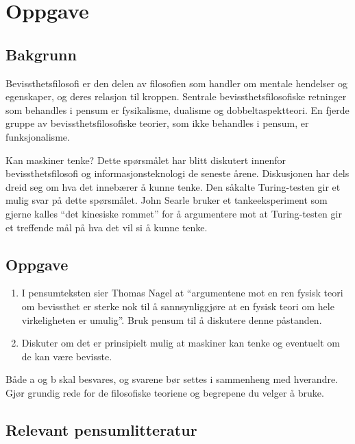 \section{Oppgave}
\subsection{Bakgrunn}\label{bakgrunn}

Bevissthetsfilosofi er den delen av filosofien som handler om mentale
hendelser og egenskaper, og deres relasjon til kroppen. Sentrale
bevissthetsfilosofiske retninger som behandles i pensum er fysikalisme,
dualisme og dobbeltaspektteori. En fjerde gruppe av
bevissthetsfilosofiske teorier, som ikke behandles i pensum, er
funksjonalisme.

Kan maskiner tenke? Dette spørsmålet har blitt diskutert innenfor
bevissthetsfilosofi og informasjonsteknologi de seneste årene.
Diskusjonen har dels dreid seg om hva det innebærer å kunne tenke. Den
såkalte Turing-testen gir et mulig svar på dette spørsmålet. John Searle
bruker et tankeeksperiment som gjerne kalles ``det kinesiske rommet''
for å argumentere mot at Turing-testen gir et treffende mål på hva det
vil si å kunne tenke.

\subsection{Oppgave}\label{oppgave}

\begin{enumerate}
  \def\labelenumi{\alph{enumi}.}
  \item
        I pensumteksten sier Thomas Nagel at ``argumentene mot en ren fysisk
        teori om bevissthet er sterke nok til å sannsynliggjøre at en fysisk
        teori om hele virkeligheten er umulig''. Bruk pensum til å diskutere
        denne påstanden.
  \item
        Diskuter om det er prinsipielt mulig at maskiner kan tenke og
        eventuelt om de kan være bevisste.
\end{enumerate}

Både a og b skal besvares, og svarene bør settes i sammenheng med
hverandre. Gjør grundig rede for de filosofiske teoriene og begrepene du
velger å bruke.

\subsection{Relevant pensumlitteratur}\label{relevant-pensumlitteratur}

